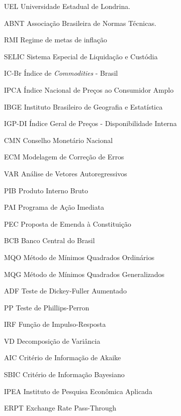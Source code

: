 \documentclass[12pt,oneside,a4paper,chapter=TITLE,english,brazil,sumario=abnt-6027-2012]{abntex2}
\begin{document}


\listoffigures*
\cleardoublepage


\listoftables*
\cleardoublepage


\begin{siglas}
	\item[UEL] Universidade Estadual de Londrina. 
	\item[ABNT] Associação Brasileira de Normas Técnicas.
	\item[RMI] Regime de metas de inflação
	\item[SELIC] Sistema Especial de Liquidação e Custódia
	\item[IC-Br] Índice de \textit{Commodities} - Brasil
	\item[IPCA] Índice Nacional de Preços ao Consumidor Amplo
	\item[IBGE] Instituto Brasileiro de Geografia e Estatística
	\item[IGP-DI] Índice Geral de Preços - Disponibilidade Interna
	\item[CMN] Conselho Monetário Nacional
	\item[ECM] Modelagem de Correção de Erros
	\item[VAR] Análise de Vetores Autoregressivos
	\item[PIB] Produto Interno Bruto
	\item[PAI] Programa de Ação Imediata
	\item[PEC] Proposta de Emenda à Constituição
	\item[BCB] Banco Central do Brasil
	\item[MQO] Método de Mínimos Quadrados Ordinários
	\item[MQG] Método de Mínimos Quadrados Generalizados
	\item[ADF] Teste de Dickey-Fuller Aumentado
	\item[PP] Teste de Phillips-Perron
	\item[IRF] Função de Impulso-Resposta
	\item[VD]  Decomposição de Variância
	\item[AIC] Critério de Informação de Akaike
	\item[SBIC] Critério de Informação Bayesiano
	\item[IPEA] Instituto de Pesquisa Econômica Aplicada
	\item[ERPT] Exchange Rate Pass-Through
\end{siglas}
\pagebreak
\end{document}

